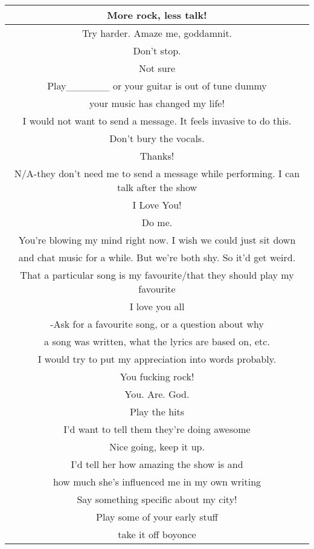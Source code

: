 \begin{center}
\begin{tabular}{|c|}
\hline
More rock, less talk!\\ \hline
Try harder. Amaze me, goddamnit.\\ \hline
Don't stop.\\ \hline
Not sure\\ \hline
Play\_\_\_\_\_\_ or your guitar is out of tune dummy\\ \hline
your music has changed my life!\\ \hline
I would not want to send a message. It feels invasive to do this.\\ \hline
Don't bury the vocals.\\ \hline
Thanks!\\ \hline
N/A-they don't need me to send a message while performing. I can talk after the show\\ \hline
I Love You!\\ \hline
Do me.\\ \hline
You're blowing my mind right now. I wish we could just sit down\\
and chat music for a while. But we're both shy. So it'd get weird.\\ \hline
That a particular song is my favourite/that they should play my favourite\\ \hline
I love you all\\ \hline
-Ask for a favourite song, or a question about why\\
a song was written, what the lyrics are based on, etc.\\ \hline
I would try to put my appreciation into words probably.\\ \hline
You fucking rock!\\ \hline
You. Are. God.\\ \hline
Play the hits\\ \hline
I'd want to tell them they're doing awesome\\ \hline
Nice going, keep it up.\\ \hline
I'd tell her how amazing the show is and\\
how much she's influenced me in my own writing\\ \hline
Say something specific about my city!\\ \hline
Play some of your early stuff\\ \hline
take it off boyonce\\
\hline
\end{tabular}


\end{center}
